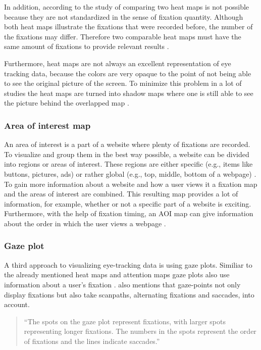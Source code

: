 In addition, according to the study of \textcite[]{djamasbi2010efficiency} comparing two heat maps is not possible because they are not standardized in the sense of fixation quantity. Although both heat maps illustrate the fixations that were recorded before, the number of the fixations may differ. Therefore two comparable heat maps must have the same amount of fixations to provide relevant results \autocite[]{djamasbi2010efficiency}. 

Furthermore, heat maps are not always an excellent representation of eye tracking data, because the colors are very opaque to the point of not being able to see the original picture of the screen. To minimize this problem in a lot of studies the heat maps are turned into shadow maps where one is still able to see the picture behind the overlapped map \autocite[]{vspakov2007visualization}.

\subsubsection{Area of interest map}
An area of interest is a part of a website where plenty of fixations are recorded. To visualize and group them in the best way possible, a website can be divided into regions or areas of interest. These regions are either specific (e.g., items like buttons, pictures, ads) or rather global (e.g., top, middle, bottom of a webpage) \autocite[]{gonzalez2011different, djamasbi2014eye}. To gain more information about a website and how a user views it a fixation map and the areas of interest are combined. This resulting map provides a lot of information, for example, whether or not a specific part of a website is exciting. Furthermore, with the help of fixation timing, an AOI map can give information about the order in which the user views a webpage \autocite[]{djamasbi2014eye}.

\subsubsection{Gaze plot}
A third approach to visualizing eye-tracking data is using gaze plots. Similiar to the already mentioned heat maps and attention maps gaze plots also use information about a user's fixation \autocite[]{kurzhals2016gaze}. \textcite[]{kurzhals2016gaze} also mentions that gaze-points not only display fixations but also take scanpaths, alternating fixations and saccades, into account. 

\begin{quote}
``The spots on the gaze plot represent fixations, with larger spots representing longer fixations. The numbers in the spots represent the order of fixations and the lines indicate saccades.''
\autocite[]{djamasbi2014eye}
\end{quote}

